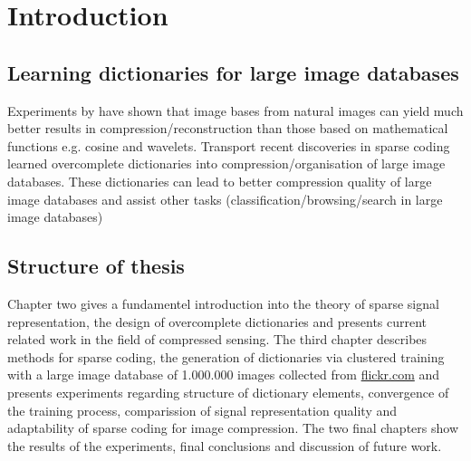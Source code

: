\chapter{Introduction}
\label{sec:introduction}
\thispagestyle{empty}
\section{Learning dictionaries for large image databases}



Experiments by \cite{} have shown \cite{} that image bases from natural images can yield much better results in compression/reconstruction than
those based on mathematical functions e.g. cosine and wavelets.
\cite{Mairal2010}
Transport recent discoveries in sparse coding learned overcomplete dictionaries into compression/organisation
of large image databases.
These dictionaries can lead to better compression quality of large image databases and assist other tasks (classification/browsing/search in large image databases)


\section{Structure of thesis}
Chapter two gives a fundamentel introduction into the theory of sparse signal representation, 
the design of overcomplete dictionaries and presents current related work in the field of compressed sensing.
The third chapter describes methods for sparse coding, the generation of dictionaries via clustered training with a large image database 
of 1.000.000 images collected from \url{flickr.com} and presents experiments regarding structure of dictionary elements, 
convergence of the training process, comparission of signal representation quality and adaptability of sparse coding for image compression.
The two final chapters show the results of the experiments, final conclusions and discussion of future work. 

